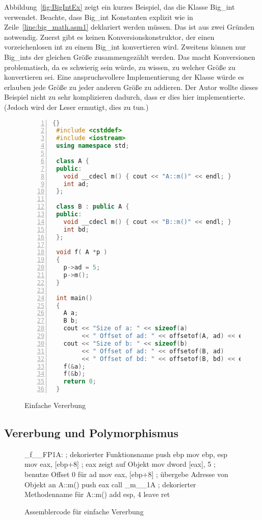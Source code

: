 Abbildung~\ref{fig:BigIntEx} zeigt ein kurzes Beispiel, das die
Klasse {\code Big\_int} verwendet. Beachte, dass {\code Big\_int}
Konstanten explizit wie in Zeile~\ref{line:big_math.asm1} deklariert
werden m\"{u}ssen. Das ist aus zwei Gr\"{u}nden notwendig. Zuerst gibt es
keinen Konversionskonstruktor, der einen vorzeichenlosen {\code int}
zu einem {\code Big\_int} konvertieren wird. Zweitens k\"{o}nnen nur
{\code Big\_int}s der gleichen Gr\"{o}{\ss}e zusammengez\"{a}hlt werden. Das
macht Konversionen problematisch, da es schwierig sein w\"{u}rde, zu
wissen, zu welcher Gr\"{o}{\ss}e zu konvertieren sei. Eine anspruchsvollere
Implementierung der Klasse w\"{u}rde es erlauben jede Gr\"{o}{\ss}e zu jeder
anderen Gr\"{o}{\ss}e zu addieren. Der Autor wollte dieses Beispiel nicht zu
sehr komplizieren dadurch, dass er dies hier implementierte. (Jedoch
wird der Leser ermutigt, dies zu tun.) 

\begin{figure}[tp]
\begin{lstlisting}[language=C++, frame=tlrb, numbers=left]{}
 #include <cstddef>
 #include <iostream>
 using namespace std;

 class A {
 public:
   void __cdecl m() { cout << "A::m()" << endl; }
   int ad;
 };

 class B : public A {
 public:
   void __cdecl m() { cout << "B::m()" << endl; }
   int bd;
 };

 void f( A *p )
 {
   p->ad = 5;
   p->m();
 }

 int main()
 {
   A a;
   B b;
   cout << "Size of a: " << sizeof(a)
        << " Offset of ad: " << offsetof(A, ad) << endl;
   cout << "Size of b: " << sizeof(b)
        << " Offset of ad: " << offsetof(B, ad)
        << " Offset of bd: " << offsetof(B, bd) << endl;
   f(&a);
   f(&b);
   return 0;
 }
\end{lstlisting}
\caption{ Einfache Vererbung \label{fig:SimpInh} }
\end{figure}

\subsection{Vererbung und Polymorphismus}

\begin{figure}[tp]
\begin{AsmCodeListing}[numbers=left, commandchars=\\\{\}]
 _f__FP1A:                    ; dekorierter Funktionsname
      push   ebp
      mov    ebp, esp
      mov    eax, [ebp+8]     ; eax zeigt auf Objekt
      mov    dword [eax], 5   ; benutze Offset 0 f\"{u}r ad
      mov    eax, [ebp+8]     ; \"{u}bergebe Adresse von Objekt an A::m()
      push   eax
      call   _m__1A           ; dekorierter Methodenname f\"{u}r A::m()
      add    esp, 4
      leave
      ret
\end{AsmCodeListing}
\caption{ Assemblercode f\"{u}r einfache Vererbung \label{fig:FAsm1} }
\end{figure}

